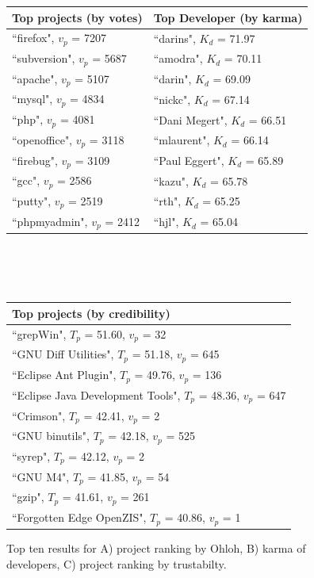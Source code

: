 \begin{figure}
{\small
  \centering
\begin{tabular}{ l | l}%
\textbf{Top projects (by votes)} & \textbf{Top Developer (by karma)}
\\\hline
``firefox", $v_p$ = 7207 & ``darins", $K_{d}$ = 71.97 
\\%
``subversion", $v_p$ = 5687 & ``amodra", $K_{d}$ = 70.11 
\\%
``apache", $v_p$ = 5107 & ``darin", $K_{d}$ = 69.09 
\\%
``mysql", $v_p$ = 4834 & ``nickc", $K_{d}$ = 67.14 
\\%
``php", $v_p$ = 4081 & ``Dani Megert", $K_{d}$ = 66.51 
\\%
``openoffice", $v_p$ = 3118 & ``mlaurent", $K_{d}$ = 66.14 
\\%
``firebug", $v_p$ = 3109 & ``Paul Eggert", $K_{d}$ = 65.89 
\\%
``gcc", $v_p$ = 2586 & ``kazu", $K_{d}$ = 65.78 
\\%
``putty", $v_p$ = 2519 & ``rth", $K_{d}$ = 65.25 
\\%
``phpmyadmin", $v_p$ = 2412 & ``hjl", $K_{d}$ = 65.04 
\\%
\end{tabular}
\\~\\~\\
\begin{tabular}{ l }
\textbf{Top projects (by credibility)}
\\\hline
``grepWin", $T_{p}$ = 51.60, $v_p$ = 32
\\%
``GNU Diff Utilities", $T_{p}$ = 51.18, $v_p$ = 645
\\%
``Eclipse Ant Plugin", $T_{p}$ = 49.76, $v_p$ = 136
\\%
``Eclipse Java Development Tools", $T_{p}$ = 48.36, $v_p$ = 647
\\%
``Crimson", $T_{p}$ = 42.41, $v_p$ = 2
\\%
``GNU binutils", $T_{p}$ = 42.18, $v_p$ = 525
\\%
``syrep", $T_{p}$ = 42.12, $v_p$ = 2
\\%
``GNU M4", $T_{p}$ = 41.85, $v_p$ = 54
\\%
``gzip", $T_{p}$ = 41.61, $v_p$ = 261
\\%
``Forgotten Edge OpenZIS", $T_{p}$ = 40.86, $v_p$ = 1
\\%
\end{tabular}

\caption{
{\small
Top ten results for A) project ranking by Ohloh, B) karma of developers, C) project ranking by trustabilty.
}}
\label{fig:table}
}
\end{figure}

